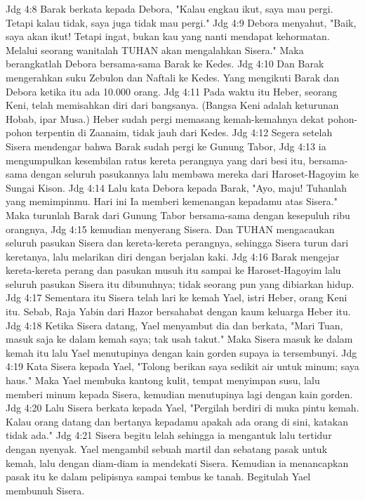 Jdg 4:8  Barak berkata kepada Debora, "Kalau engkau ikut, saya mau pergi. Tetapi kalau tidak, saya juga tidak mau pergi."
Jdg 4:9  Debora menyahut, "Baik, saya akan ikut! Tetapi ingat, bukan kau yang nanti mendapat kehormatan. Melalui seorang wanitalah TUHAN akan mengalahkan Sisera." Maka berangkatlah Debora bersama-sama Barak ke Kedes.
Jdg 4:10  Dan Barak mengerahkan suku Zebulon dan Naftali ke Kedes. Yang mengikuti Barak dan Debora ketika itu ada 10.000 orang.
Jdg 4:11  Pada waktu itu Heber, seorang Keni, telah memisahkan diri dari bangsanya. (Bangsa Keni adalah keturunan Hobab, ipar Musa.) Heber sudah pergi memasang kemah-kemahnya dekat pohon-pohon terpentin di Zaanaim, tidak jauh dari Kedes.
Jdg 4:12  Segera setelah Sisera mendengar bahwa Barak sudah pergi ke Gunung Tabor,
Jdg 4:13  ia mengumpulkan kesembilan ratus kereta perangnya yang dari besi itu, bersama-sama dengan seluruh pasukannya lalu membawa mereka dari Haroset-Hagoyim ke Sungai Kison.
Jdg 4:14  Lalu kata Debora kepada Barak, "Ayo, maju! Tuhanlah yang memimpinmu. Hari ini Ia memberi kemenangan kepadamu atas Sisera." Maka turunlah Barak dari Gunung Tabor bersama-sama dengan kesepuluh ribu orangnya,
Jdg 4:15  kemudian menyerang Sisera. Dan TUHAN mengacaukan seluruh pasukan Sisera dan kereta-kereta perangnya, sehingga Sisera turun dari keretanya, lalu melarikan diri dengan berjalan kaki.
Jdg 4:16  Barak mengejar kereta-kereta perang dan pasukan musuh itu sampai ke Haroset-Hagoyim lalu seluruh pasukan Sisera itu dibunuhnya; tidak seorang pun yang dibiarkan hidup.
Jdg 4:17  Sementara itu Sisera telah lari ke kemah Yael, istri Heber, orang Keni itu. Sebab, Raja Yabin dari Hazor bersahabat dengan kaum keluarga Heber itu.
Jdg 4:18  Ketika Sisera datang, Yael menyambut dia dan berkata, "Mari Tuan, masuk saja ke dalam kemah saya; tak usah takut." Maka Sisera masuk ke dalam kemah itu lalu Yael menutupinya dengan kain gorden supaya ia tersembunyi.
Jdg 4:19  Kata Sisera kepada Yael, "Tolong berikan saya sedikit air untuk minum; saya haus." Maka Yael membuka kantong kulit, tempat menyimpan susu, lalu memberi minum kepada Sisera, kemudian menutupinya lagi dengan kain gorden.
Jdg 4:20  Lalu Sisera berkata kepada Yael, "Pergilah berdiri di muka pintu kemah. Kalau orang datang dan bertanya kepadamu apakah ada orang di sini, katakan tidak ada."
Jdg 4:21  Sisera begitu lelah sehingga ia mengantuk lalu tertidur dengan nyenyak. Yael mengambil sebuah martil dan sebatang pasak untuk kemah, lalu dengan diam-diam ia mendekati Sisera. Kemudian ia menancapkan pasak itu ke dalam pelipisnya sampai tembus ke tanah. Begitulah Yael membunuh Sisera.

